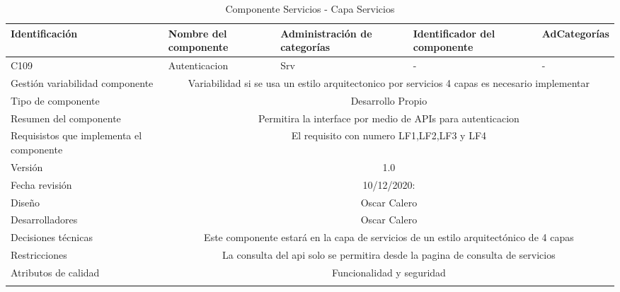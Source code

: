 \documentclass[10pt,a4paper,openany]{book}
\begin{document}
\begin{longtable}{|p{3cm}|p{3cm}|p{3cm}|p{3cm}|p{3cm}|} \hline
Identificación & Nombre del componente & Administración de categorías & Identificador del componente & AdCategorías \\[0.5ex] \hline
C109& Autenticacion& Srv& -& -\\[0.5ex] \hline
Gestión variabilidad componente & \multicolumn{4}{|c|}{Variabilidad si se usa un estilo arquitectonico por servicios 4 capas es necesario implementar} \\ \hline
Tipo de componente & \multicolumn{4}{|c|}{Desarrollo Propio} \\ \hline
Resumen del componente & \multicolumn{4}{|c|}{Permitira la interface por medio de APIs para autenticacion} \\ \hline
Requisistos que implementa el componente & \multicolumn{4}{|c|}{El requisito con numero LF1,LF2,LF3 y LF4 } \\ \hline
Versión & \multicolumn{4}{|c|}{1.0 } \\ \hline
Fecha revisión & \multicolumn{4}{|c|}{ 10/12/2020:} \\ \hline
Diseño & \multicolumn{4}{|c|}{Oscar Calero} \\ \hline
Desarrolladores & \multicolumn{4}{|c|}{Oscar Calero} \\ \hline
Decisiones técnicas & \multicolumn{4}{|c|}{Este componente estará en la capa de servicios de un estilo arquitectónico de 4 capas  } \\ \hline
Restricciones & \multicolumn{4}{|c|}{La consulta del api solo se permitira desde la pagina de consulta de servicios} \\ \hline
Atributos de calidad & \multicolumn{4}{|c|}{Funcionalidad y seguridad} \\ \hline
\caption{Componente Servicios - Capa Servicios}
\label{table:t6}
\end{longtable}
\end{document}
